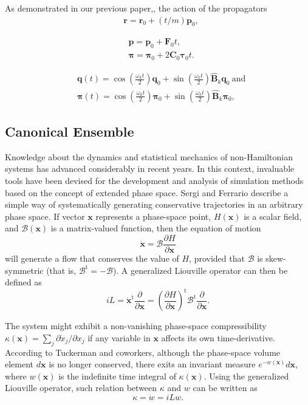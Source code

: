\documentclass[aip,jcp,reprint,amsmath,amssymb]{revtex4-1}
\newcommand{\mt}[1]{\boldsymbol{\mathbf{#1}}}           %
\newcommand{\vt}[1]{\boldsymbol{\mathbf{#1}}}           %
\newcommand{\tr}[1]{#1^\text{t}}                        %
\newcommand{\diff}[2]{\dfrac{\partial #1}{\partial #2}} %
\begin{document}
As demonstrated in our previous paper,\cite{Abreu2017}, the action of the propagators 
\begin{align*}
&{\vt r} = {\vt r}_0 + (t/m) {\vt p}_0,
\end{align*}

\begin{align*}
&{\vt p} = {\vt p}_0 + {\vt F}_0 t, \\
&{\vt \pi} = {\vt \pi}_0 +  2 {\mt C}_0 {\vt \tau}_0 t.
\end{align*}

\begin{align*}
&{\vt q}(t) = \cos\left(\frac{\omega_k t}{2}\right) \vt q_0 + \sin\left(\frac{\omega_k t}{2}\right) \hat{\mt B}_k \vt q_0 \ \text{and} \\
&{\vt \pi}(t) = \cos\left(\frac{\omega_k t}{2}\right) \vt \pi_0 + \sin\left(\frac{\omega_k t}{2}\right) \hat{\mt B}_k \vt \pi_0, 
\end{align*}

\subsection{Canonical Ensemble}
\label{sec:canonical}

Knowledge about the dynamics and statistical mechanics of non-Hamiltonian systems has advanced considerably in recent years.\cite{Tuckerman_1999, Tuckerman2001, Sergi2001, Sergi2003, Ezra2004, Sergi2004, Ezra2006, Sergi2010b} In this context, invaluable tools have been devised for the development and analysis of simulation methods based on the concept of extended phase space. Sergi and Ferrario\cite{Sergi2001} describe a simple way of systematically generating conservative trajectories in an arbitrary phase space. If vector $\vt x$ represents a phase-space point, $H(\vt x)$ is a scalar field, and $\boldsymbol{\mathcal B}(\vt x)$ is a matrix-valued function, then the equation of motion
\begin{equation} \label{eq:eq_of_motion}
\dot{\vt x} = \boldsymbol{\mathcal B}\diff{H}{\vt x}
\end{equation}
will generate a flow that conserves the value of $H$, provided that $\boldsymbol{\mathcal B}$ is skew-symmetric (that is, $\tr{ \boldsymbol{ \mathcal B }} = -\boldsymbol{ \mathcal B }$). A generalized Liouville operator can then be defined as\cite{Sergi2004}
\[
i\!L = \tr{\dot{\vt x}}\diff{}{\vt x} = \tr{\left(\diff{H}{\vt x}\right)} \tr{\boldsymbol{\mathcal B}} \diff{}{\vt x}.
\]

The system might exhibit a non-vanishing phase-space compressibility $\kappa(\vt x) = \sum_j \partial \dot{x}_j/\partial x_j$ if any variable in $\vt x$ affects its own time-derivative. According to Tuckerman and coworkers,\cite{Tuckerman_1999, Tuckerman2001} although the phase-space volume element $d\vt x$ is no longer conserved, there exits an invariant measure $e^{-w(\vt x)}d\vt x$, where $w(\vt x)$ is the indefinite time integral of $\kappa(\vt x)$. Using the generalized Liouville operator, such relation between $\kappa$ and $w$ can be written as
\begin{equation}
\label{eq:relation_kappa_w}
\kappa = \dot w = i\!L w.
\end{equation}
\end{document}

